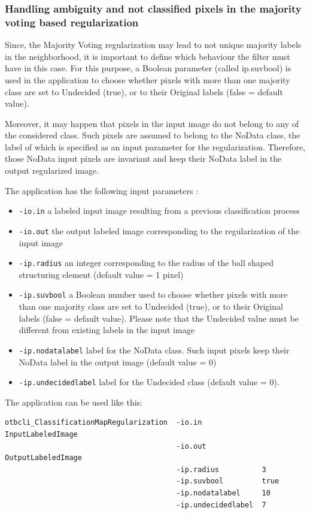 \subsubsection{Handling ambiguity and not classified pixels in the majority voting based regularization}

Since, the Majority Voting regularization may lead to not unique majority labels in the neighborhood, it is important to define
which behaviour the filter must have in this case. For this purpose, a Boolean parameter (called ip.suvbool) is used in the
 application to choose whether pixels with more than one majority class are set to
Undecided (true), or to their Original labels (false = default value).

Moreover, it may happen that pixels in the input image do not belong to any of the considered class. Such pixels are
assumed to belong to the NoData class, the label of which is specified as an input parameter for the regularization. Therefore,
those NoData input pixels are invariant and keep their NoData label in the output regularized image.
 
The  application has the following input parameters :
\begin{itemize}
\item \verb?-io.in? a labeled input image resulting from a previous classification process
\item \verb?-io.out? the output labeled image corresponding to the regularization of the input image
\item \verb?-ip.radius? an integer corresponding to the radius of the ball shaped structuring element (default value = 1 pixel)
\item \verb?-ip.suvbool? a Boolean number used to choose whether pixels with more than one majority class are set to Undecided (true),
or to their Original labels (false = default value). Please note that the Undecided value must be different from existing labels in the input image
\item \verb?-ip.nodatalabel? label for the NoData class. Such input pixels keep their NoData label in the output image (default value = 0)
\item \verb?-ip.undecidedlabel? label for the Undecided class (default value = 0).
\end{itemize}


The application can be used like this:
\begin{verbatim}
otbcli_ClassificationMapRegularization  -io.in              InputLabeledImage
                                        -io.out             OutputLabeledImage
                                        -ip.radius          3
                                        -ip.suvbool         true
                                        -ip.nodatalabel     10
                                        -ip.undecidedlabel  7
\end{verbatim}
 

